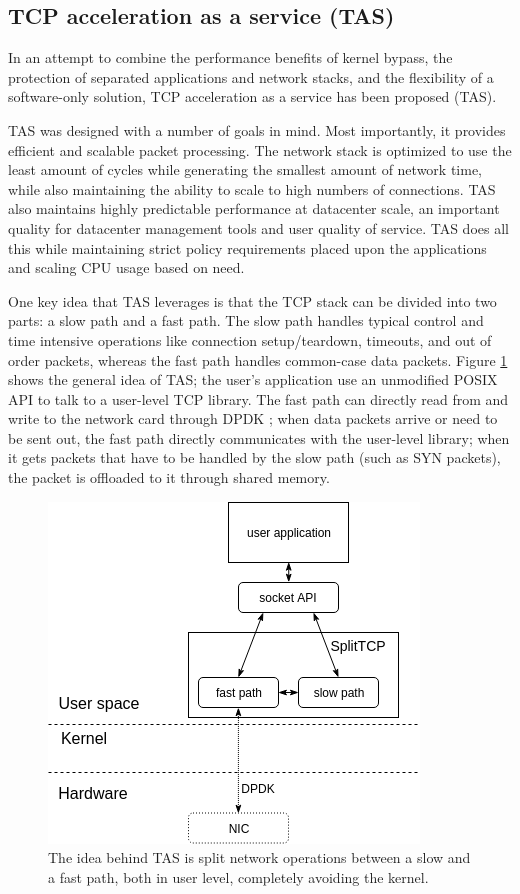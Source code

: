 \subsection{TCP acceleration as a service (TAS)}

In an attempt to combine the performance benefits of kernel bypass, the 
protection of separated applications and network stacks, and the flexibility of
a software-only solution, TCP acceleration as a service has been proposed (TAS).

TAS was designed with a number of goals in mind. Most importantly, it provides
efficient and scalable packet processing. The network stack is optimized to use 
the least amount of cycles while generating the smallest amount of network time,
while also maintaining the ability to scale to high numbers of connections. 
TAS also maintains highly predictable performance at datacenter scale, an 
important quality for datacenter management tools and user quality of service.
TAS does all this while maintaining strict policy requirements placed upon the
applications and scaling CPU usage based on need. 
 
One key idea that TAS leverages is that the TCP stack can be divided into two 
parts: a slow path and a fast path. The slow path handles typical control and 
time intensive operations like connection setup/teardown, timeouts, and out of 
order packets, whereas the fast path handles common-case data packets. Figure 
\ref{fig:splittcp} shows the general idea of TAS; the user's application use an 
unmodified POSIX API to talk to a user-level TCP library. The fast path can 
directly read from and write to the network card through DPDK \cite{dpdk}; when 
data packets arrive or need to be sent out, the fast path directly communicates 
with the user-level library; when it gets packets that have to be handled by the
slow path (such as SYN packets), the packet is offloaded to it through shared 
memory.

\begin{figure}
\centering
\includegraphics[width=0.7\columnwidth]{figures/splittcp_default.png}
\caption{The idea behind TAS is split network operations between a slow and a fast path, both in user level, completely
avoiding the kernel.}
\label{fig:splittcp}
\end{figure}

